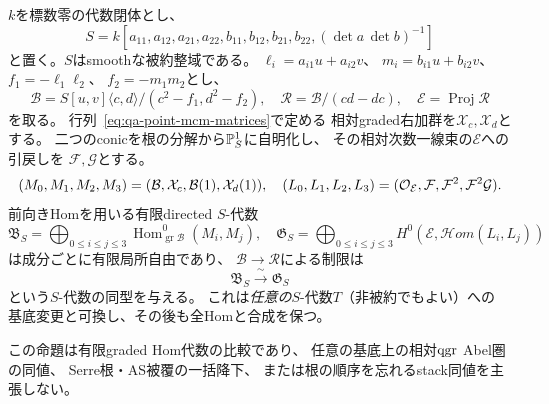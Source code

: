 \begin{proposition}[順序付き二根対の普遍族における相対有限End]
\label{prop:qa-point-relative-split-root-end}
$k$を標数零の代数閉体とし、
\[
 S=k[a_{11},a_{12},a_{21},a_{22},
       b_{11},b_{12},b_{21},b_{22},
       (\det a\,\det b)^{-1}]
\]
と置く。$S$はsmoothな被約整域である。
$\ell_i=a_{i1}u+a_{i2}v$、
$m_i=b_{i1}u+b_{i2}v$、$f_1=-\ell_1\ell_2$、
$f_2=-m_1m_2$とし、
\[
 \mathcal B=S[u,v]\langle c,d\rangle/
      (c^2-f_1,d^2-f_2),\quad
 \mathcal R=\mathcal B/(cd-dc),\quad
 \mathcal E=\operatorname{Proj}\mathcal R
\]
を取る。
行列~\eqref{eq:qa-point-mcm-matrices}で定める
相対graded右加群を$\mathcal X_c,\mathcal X_d$とする。
二つのconicを根の分解から$\mathbb P^1_S$に自明化し、
その相対次数一線束の$\mathcal E$への引戻しを
$\mathcal F,\mathcal G$とする。
\[
  (M_0,M_1,M_2,M_3)
   =(\mathcal B,\mathcal X_c,\mathcal B(1),\mathcal X_d(1)),
  \quad
  (L_0,L_1,L_2,L_3)
   =(\mathcal O_{\mathcal E},\mathcal F,\mathcal F^2,
                                \mathcal F^2\mathcal G).
\]
前向きHomを用いる有限directed $S$-代数
\[
 \mathfrak B_S=\bigoplus_{0\le i\le j\le3}
    \operatorname{Hom}^{0}_{\operatorname{gr}\mathcal B}(M_i,M_j),
 \quad
 \mathfrak G_S=\bigoplus_{0\le i\le j\le3}
    H^0(\mathcal E,\mathcal Hom(L_i,L_j))
\]
は成分ごとに有限局所自由であり、
$\mathcal B\to\mathcal R$による制限は
\begin{equation}
 \mathfrak B_S\xrightarrow{\ \sim\ }\mathfrak G_S
 \label{eq:qa-point-relative-split-root-end}
\end{equation}
という$S$-代数の同型を与える。
これは\emph{任意の}$S$-代数$T$（非被約でもよい）への
基底変更と可換し、その後も全Homと合成を保つ。

この命題は有限graded Hom代数の比較であり、
任意の基底上の相対$\operatorname{qgr}$ Abel圏の同値、
Serre根・AS被覆の一括降下、
または根の順序を忘れるstack同値を主張しない。
\end{proposition}
